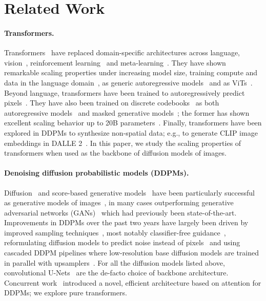\documentclass[10pt,twocolumn,letterpaper]{article}
\begin{document}
\section{Related Work}



\paragraph{Transformers.} Transformers~\cite{Vaswani2017} have replaced domain-specific architectures across language, vision~\cite{Dosovitskiy2020}, reinforcement learning~\cite{chen2021decision,janner2021trajectory} and meta-learning~\cite{Peebles2022}. They have shown remarkable scaling properties under increasing model size, training compute and data in the language domain~\cite{kaplan2020scaling}, as generic autoregressive models~\cite{henighan2020scaling} and as ViTs~\cite{zhai2022scaling}. Beyond language, transformers have been trained to autoregressively predict pixels~\cite{parmar2018image,child2019generating,Chen2020generative}. They have also been trained on discrete codebooks~\cite{van2017neural} as both autoregressive models~\cite{esser2020taming,ramesh2021zero} and masked generative models~\cite{chang2022maskgit,gu2022vector}; the former has shown excellent scaling behavior up to 20B parameters~\cite{yu2022scaling}. Finally, transformers have been explored in DDPMs to synthesize non-spatial data; e.g., to generate CLIP image embeddings in DALLE 2~\cite{ramesh2022hierarchical,radford2021}. In this paper, we study the scaling properties of transformers when used as the backbone of diffusion models of images.

\paragraph{Denoising diffusion probabilistic models (DDPMs).}
Diffusion~\cite{sohl2015thermodynamics,ho2020ddpm} and score-based generative models~\cite{hyvarinen2005estimation,song2019generative} have been particularly successful as generative models of images~\cite{nichol2021glide,ramesh2022hierarchical,imagen2022,rombach2021highresolution}, in many cases outperforming generative adversarial networks (GANs)~\cite{goodfellow2014generative} which had previously been state-of-the-art. Improvements in DDPMs over the past two years have largely been driven by improved sampling techniques~\cite{ho2020ddpm,song2020denoising,Karras2022edm}, most notably classifier-free guidance~\cite{ho2021classifier}, reformulating diffusion models to predict noise instead of pixels~\cite{ho2020ddpm} and using cascaded DDPM pipelines where low-resolution base diffusion models are trained in parallel with upsamplers~\cite{ho2021cascaded,dhariwal2021adm}. For all the diffusion models listed above, convolutional U-Nets~\cite{ronneberger2015u} are the de-facto choice of backbone architecture. Concurrent work~\cite{jabri2022scalable} introduced a novel, efficient architecture based on attention for DDPMs; we explore pure transformers.
\end{document}
